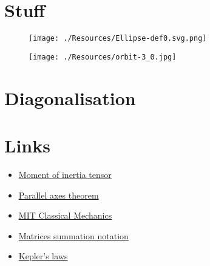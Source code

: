 \documentclass[12pt, a4paper]{article}
\begin{document}
\section{Stuff}

\begin{figure}[H]
     \begin{center}
         \texttt{[image: ./Resources/Ellipse-def0.svg.png]}
     \end{center}
\end{figure}

\begin{figure}[H]
     \begin{center}
         \texttt{[image: ./Resources/orbit-3\_0.jpg]}
     \end{center}
\end{figure}

\section{Diagonalisation}

\section{Links}

\begin{itemize}
    \item \href{https://www.youtube.com/watch?v=HxH7fAQjt70}{Moment of inertia tensor}  
    \item \href{https://www.youtube.com/watch?v=r2Qb0vsxa8Y}{Parallel axes theorem}
    \item \href{https://ocw.mit.edu/courses/8-01sc-classical-mechanics-fall-2016/}{MIT Classical Mechanics}
    \item \href{https://math.stackexchange.com/questions/2063241/matrix-multiplication-notation}{Matrices summation notation}
    \item \href{https://youtube.com/playlist?list=PLzhedHRpzyNuhFKs4GsZ-RQEYUklG9INh}{Kepler's laws}
\end{itemize}

\end{document}
